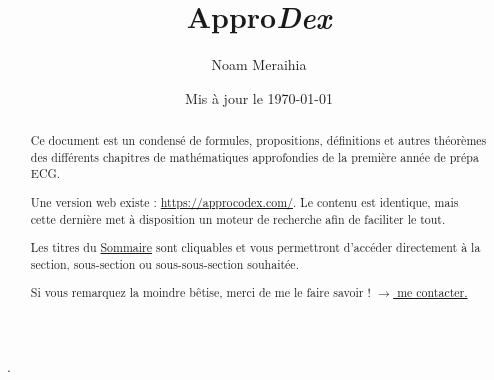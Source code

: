 \documentclass[a4paper, 12pt]{article}
\title{\textbf{Appro}\textit{Dex}}
\author{Noam Meraihia}
\date{Mis à jour le \today}
\makeatletter
\newcommand{\emailaddress}{noam.meraihia@lycee-berthollet.com}
\makeatother
\begin{document}
    \maketitle

    \begin{abstract}
        Ce document est un condensé de formules, propositions, définitions et autres 
        théorèmes des différents chapitres de mathématiques approfondies de la première année de prépa ECG.

        Une version web existe : \url{https://approcodex.com/}. Le contenu est identique, mais cette dernière met à disposition un moteur de recherche
        afin de faciliter le tout.

        Les titres du \hyperref[sommaire]{Sommaire} sont cliquables et vous permettront d'accéder directement à la 
        section, sous-section ou sous-sous-section souhaitée.

        Si vous remarquez la moindre bêtise, merci de me le faire savoir ! \href{mailto:\emailaddress}{$\rightarrow$ me contacter.}

    \end{abstract}

    \tableofcontents
    \label{sommaire}

    \setlength{\headheight}{15pt}.
    \newpage

    
    
\end{document}
